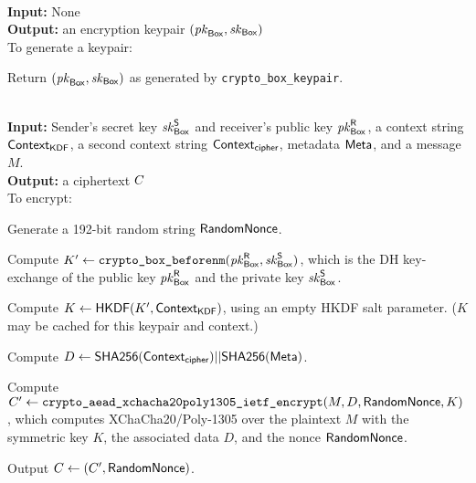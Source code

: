 {\underline {\bf \cboxkeygen}}\\
{\bf Input:} None \\
{\bf Output:} an encryption keypair $(\mathit{pk}_{{\sf Box}}, \mathit{sk}_{{\sf Box}})$ \\

\vspace{-1.5em}
To generate a keypair:

\vspace{-1.5em}
\begingroup
\RaggedRight
\begin{enumerate*}
\item Return $(\mathit{pk}_{{\sf Box}}, \mathit{sk}_{{\sf Box}})$ as generated by \texttt{crypto\_box\_keypair}.
\end{enumerate*}
\endgroup


{\underline {\bf \cboxencrypt}} \\
{\bf Input:} Sender's secret key $\mathit{sk}_{{\sf Box}}^{\sf S}$ and receiver's public key $\mathit{pk}_{{\sf Box}}^{\sf R}$, a context string ${\sf Context}_\textsf{KDF}$, a second context string ${\sf Context}_\textsf{cipher}$, metadata ${\sf Meta}$, and a message $M$. \\
{\bf Output:} a ciphertext $C$ \\

\vspace{-1.5em}
To encrypt:

\vspace{-1.5em}
\begingroup
\RaggedRight
\begin{enumerate*}
\item Generate a 192-bit random string ${\sf RandomNonce}$.
\item Compute $K' \leftarrow \texttt{crypto\_box\_beforenm}(\mathit{pk}_{{\sf Box}}^{\sf R}, \mathit{sk}_{{\sf Box}}^{\sf S})$, which is the DH key-exchange of the public key $\mathit{pk}_{{\sf Box}}^{\sf R}$ and the private key $\mathit{sk}_{{\sf Box}}^{\sf S}$.
\item Compute $K \leftarrow {\sf HKDF}(K', {\sf Context}_\textsf{KDF})$, using an empty HKDF salt parameter. ($K$ may be cached for this keypair and context.)
\item Compute $D \leftarrow {\sf SHA256}({\sf Context}_\textsf{cipher}) || {\sf SHA256}({\sf Meta})$.
\item Compute $C' \leftarrow \texttt{crypto\_aead\_xchacha20poly1305\_ietf\_encrypt}(M, D, {\sf RandomNonce}, K)$, which computes XChaCha20/Poly-1305 over the plaintext $M$ with the symmetric key $K$, the associated data $D$, and the nonce ${\sf RandomNonce}$.
\item Output $C \leftarrow (C', {\sf RandomNonce})$.
\end{enumerate*}
\endgroup

